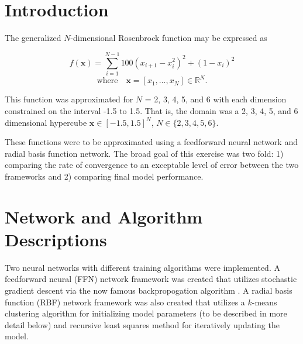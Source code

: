 \documentclass[conference]{IEEEtran}
\begin{document}
\section{Introduction}
\label{intro}
The generalized $N$-dimensional Rosenbrock function may be expressed as

$$
f(\mathbf{x}) = \sum_{i=1}^{N-1} 100 (x_{i+1} - x_i^2 )^2 + (1-x_i)^2
$$$$
  \mbox{where} \quad \mathbf{x} = [x_1, \ldots, x_N] \in \mathbb{R}^N.
$$

This function was approximated for $N$ = 2, 3, 4, 5, and 6 with each dimension constrained on the interval -1.5 to 1.5. That is, the domain was a 2, 3, 4, 5, and 6 dimensional hypercube $ \mathbf{x} \in [-1.5, 1.5]^N$, $N \in \{2,3,4,5,6\}$.

These functions were to be approximated using a feedforward neural network and radial basis function network. The broad goal of this exercise was two fold: 1) comparing the rate of convergence to an exceptable level of error between the two frameworks and 2) comparing final model performance.
  
\section{Network and Algorithm Descriptions}
Two neural networks with different training algorithms were implemented. A feedforward neural (FFN) network framework was created that utilizes stochastic gradient descent via the now famous backpropogation algorithm \cite{rumelhart}. A radial basis function (RBF) network framework was also created that utilizes a $k$-means clustering algorithm for initializing model parameters (to be described in more detail below) and recursive least squares method for iteratively updating the model.
\end{document}
